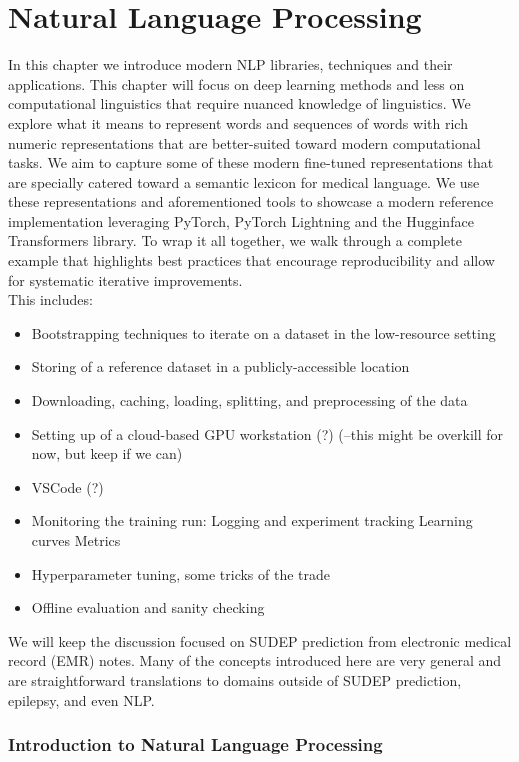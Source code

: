 \chapter{Natural Language Processing}
In this chapter we introduce modern NLP libraries, techniques and their applications.
This chapter will focus on deep learning methods and less on computational linguistics that require nuanced knowledge of linguistics.
We explore what it means to represent words and sequences of words with rich numeric representations that are better-suited toward modern computational tasks.
We aim to capture some of these modern fine-tuned representations that are specially catered toward a semantic lexicon for medical language.
We use these representations and aforementioned tools to showcase a modern reference implementation leveraging PyTorch, PyTorch Lightning and the Hugginface Transformers library.
To wrap it all together, we walk through a complete example that highlights best practices that encourage reproducibility and allow for systematic iterative improvements.
\\

\noindent This includes:
\begin{itemize}
\item Bootstrapping techniques to iterate on a dataset in the low-resource setting
\item Storing of a reference dataset in a publicly-accessible location
\item Downloading, caching, loading, splitting, and preprocessing of the data
\item Setting up of a cloud-based GPU workstation (?) (--this might be overkill for now, but keep if we can)
\item VSCode (?)
\item Monitoring the training run:
  \subitem Logging and experiment tracking
  \subitem Learning curves
  \subitem Metrics
\item Hyperparameter tuning, some tricks of the trade
\item Offline evaluation and sanity checking
\end{itemize}
We will keep the discussion focused on SUDEP prediction from electronic medical record (EMR) notes.
Many of the concepts introduced here are very general and are straightforward translations to domains outside of SUDEP prediction, epilepsy, and even NLP.

\subsection{Introduction to Natural Language Processing}


